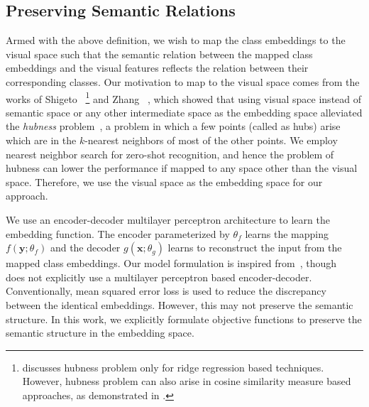 \documentclass[10pt,twocolumn,letterpaper]{article}
\begin{document}
\subsection{Preserving Semantic Relations}
Armed with the above definition, we wish to map the class embeddings to the visual space such that the semantic
relation between the mapped class embeddings and the visual features reflects the relation between their corresponding classes. Our motivation to map to the visual space comes from the works of Shigeto \etal~\cite{shigeto2015ridge}\footnote{\cite{shigeto2015ridge} discusses hubness problem only for ridge regression based techniques. However, hubness problem can also arise in cosine similarity measure based approaches, as demonstrated in \cite{radovanovic2010existence}.} %
and Zhang \etal~\cite{zhang2016learning}, which showed that using visual space instead of semantic space or any other intermediate space as the embedding space alleviated the \textit{hubness} problem~\cite{tomasev2014role,radovanovic2010hubs}, a problem in which a few points (called as hubs) arise which are in the $k$-nearest neighbors of most of the other points. We employ nearest neighbor search for zero-shot recognition, and hence the problem of hubness can lower the performance if mapped to any space other than the visual space. Therefore, we use the visual space as the embedding space for our approach. 

We use an encoder-decoder multilayer perceptron architecture to learn the embedding function. The encoder parameterized by $\theta_f$ learns the mapping $f(\mathbf{y};\theta_f)$ and the decoder $g(\mathbf{x};\theta_g)$ learns to reconstruct the input from the mapped class embeddings. Our model formulation is inspired from~\cite{Kodirov_2017_CVPR}, though~\cite{Kodirov_2017_CVPR} does not explicitly use a multilayer perceptron based encoder-decoder. Conventionally, mean squared error loss is used to reduce the discrepancy between the identical embeddings. However, this may not preserve the semantic structure. In this work, we explicitly formulate objective functions to preserve the semantic structure in the embedding space.
\end{document}
